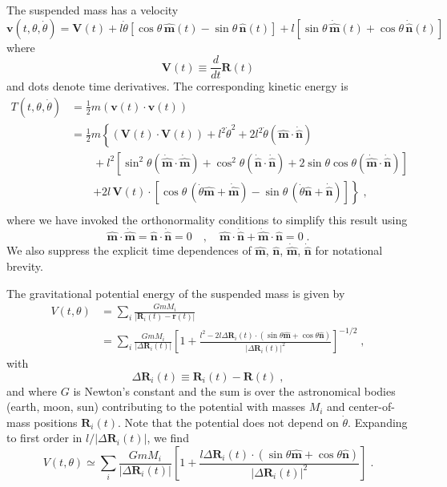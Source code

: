 \documentclass[12pt]{article}
\providecommand{\vecsymbol}[1]{\ensuremath{\boldsymbol{#1}}}
\providecommand{\rv}{\vecsymbol{r}}
\providecommand{\Rv}{\vecsymbol{R}}
\providecommand{\vv}{\vecsymbol{v}}
\providecommand{\Vv}{\vecsymbol{V}}
\providecommand{\mv}{\hat{\vecsymbol{m}}}
\providecommand{\nv}{\hat{\vecsymbol{n}}}
\providecommand{\thdot}{\dot{\theta}}
\begin{document}
The suspended mass has a velocity
\begin{equation}
\vv(t,\theta,\thdot) = \Vv(t) + l\thdot \left[ \cos\theta\,\mv(t) - \sin\theta\,\nv(t) \right]
+ l \left[ \sin\theta\,\dot{\mv}(t) + \cos\theta\,\dot{\nv}(t) \right]
\end{equation}
where
\begin{equation}
\Vv(t) \equiv \frac{d}{dt}\Rv(t)
\end{equation}
and dots denote time derivatives. The corresponding kinetic energy is
\begin{equation}
\begin{split}
T(t,\theta,\thdot) &= \frac{1}{2} m \left( \vv(t)\cdot \vv(t) \right) \\
&= \frac{1}{2} m \left\{ (\Vv(t)\cdot\Vv(t)) + l^2\thdot^2 + 2l^2\thdot (\mv\cdot\dot{\nv}) \right. \\
&\qquad + l^2 \left[\sin^2\theta (\dot{\mv}\cdot\dot{\mv}) + \cos^2\theta (\dot{\nv}\cdot\dot{\nv}) +
2 \sin\theta\cos\theta (\dot{\mv}\cdot\dot{\nv}) \right] \\
&\qquad \left. +2 l\,\Vv(t)\cdot\left[ \cos\theta\,(\thdot \mv+\dot{\mv}) -
\sin\theta\,(\thdot \nv+\dot{\nv})\right] \right\} \; , \\ 
\end{split}
\end{equation}
where we have invoked the orthonormality conditions to simplify this result using
\begin{equation}
\mv\cdot\dot{\mv} = \nv\cdot\dot{\nv} = 0 \quad , \quad
\mv\cdot\dot{\nv} + \dot{\mv}\cdot\nv = 0 \; .
\end{equation}
We also suppress the explicit time dependences of $\mv$, $\nv$, $\dot{\mv}$, $\dot{\nv}$ for notational brevity.

The gravitational potential energy of the suspended mass is given by
\begin{equation}
\begin{split}
V(t,\theta) &= \sum_i \frac{G m M_i}{\left| \Rv_i(t) - \rv(t) \right|} \\
&= \sum_i \frac{G m M_i}{\left|\Delta\Rv_i(t)\right|} \left[
1 + \frac{l^2 - 2 l \Delta\Rv_i(t)\cdot(\sin\theta \mv + \cos\theta \nv)}{\left|\Delta\Rv_i(t)\right|^2}
\right]^{-1/2} \; ,
\end{split}
\end{equation}
with
\begin{equation}
\Delta\Rv_i(t) \equiv \Rv_i(t)-\Rv(t) \; ,
\end{equation}
and where $G$ is Newton's constant and the sum is over the astronomical bodies (earth, moon, sun) contributing to the potential with masses $M_i$ and center-of-mass positions $\Rv_i(t)$. Note that the potential does not depend on $\thdot$. Expanding to first order in $l/|\Delta\Rv_i(t)|$, we find
\begin{equation}
V(t,\theta) \simeq \sum_i \frac{G m M_i}{\left|\Delta\Rv_i(t)\right|} \left[1 +
\frac{l \Delta\Rv_i(t)\cdot(\sin\theta \mv + \cos\theta \nv)}{\left|\Delta\Rv_i(t)\right|^2}\right] \; .
\end{equation}
\end{document}

